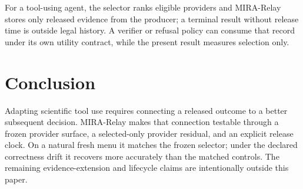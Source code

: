 \documentclass[sigconf,anonymous]{aamas}
\begin{document}
For a tool-using agent, the selector ranks eligible providers and MIRA-Relay stores only released evidence from the producer; a terminal result without release time is outside legal history. A verifier or refusal policy can consume that record under its own utility contract, while the present result measures selection only.

\section{Conclusion}
Adapting scientific tool use requires connecting a released outcome to a better subsequent decision. MIRA-Relay makes that connection testable through a frozen provider surface, a selected-only provider residual, and an explicit release clock. On a natural fresh menu it matches the frozen selector; under the declared correctness drift it recovers more accurately than the matched controls. The remaining evidence-extension and lifecycle claims are intentionally outside this paper.

\clearpage
\balance


\end{document}
